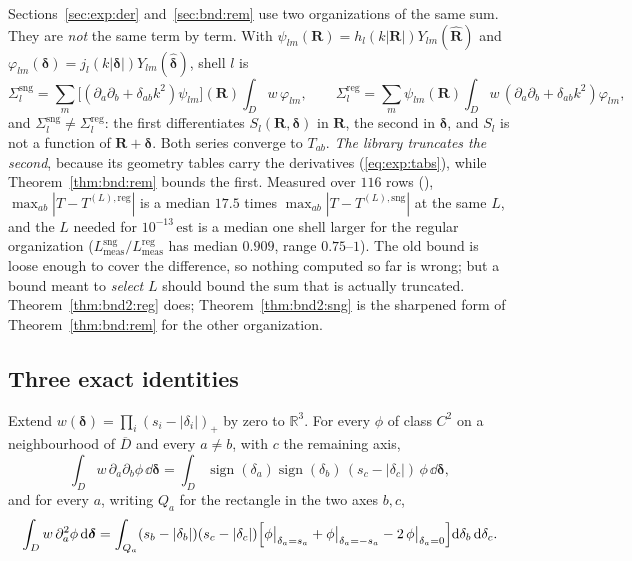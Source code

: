 Sections~\ref{sec:exp:der} and~\ref{sec:bnd:rem} use two organizations of the same sum.
They are \emph{not} the same term by term. With
$\psi_{lm}(\mathbf{R}) = h_l(k|\mathbf{R}|)Y_{lm}(\hat{\mathbf{R}})$ and
$\varphi_{lm}(\boldsymbol{\delta}) =
j_l(k|\boldsymbol{\delta}|)Y_{lm}(\hat{\boldsymbol{\delta}})$, shell $l$ is
\begin{equation}
\Sigma^{\mathrm{sng}}_l = \sum_m\bigl[(\partial_a\partial_b+\delta_{ab}k^2)\psi_{lm}\bigr]
(\mathbf{R})\!\int_D\! w\,\varphi_{lm},
\qquad
\Sigma^{\mathrm{reg}}_l = \sum_m \psi_{lm}(\mathbf{R})\!\int_D\! w\,
(\partial_a\partial_b+\delta_{ab}k^2)\varphi_{lm},
\label{eq:bnd2:two}
\end{equation}
and $\Sigma^{\mathrm{sng}}_l \neq \Sigma^{\mathrm{reg}}_l$: the first differentiates
$S_l(\mathbf{R},\boldsymbol{\delta})$ in $\mathbf{R}$, the second in
$\boldsymbol{\delta}$, and $S_l$ is not a function of
$\mathbf{R}+\boldsymbol{\delta}$. Both series converge to $T_{ab}$. \emph{The library
truncates the second}, because its geometry tables carry the derivatives
(\eqref{eq:exp:tabs}), while Theorem~\ref{thm:bnd:rem} bounds the first. Measured over
$116$ rows (), $\max_{ab}|T-T^{(L),\mathrm{reg}}|$ is a median $17.5$ times
$\max_{ab}|T-T^{(L),\mathrm{sng}}|$ at the same $L$, and the $L$ needed for
$10^{-13}\,\mathrm{est}$ is a median one shell larger for the regular organization
($L^{\mathrm{sng}}_{\mathrm{meas}}/L^{\mathrm{reg}}_{\mathrm{meas}}$ has median $0.909$,
range $0.75$--$1$). The old bound is loose enough to cover the difference, so nothing
computed so far is wrong; but a bound meant to \emph{select} $L$ should bound the sum that
is actually truncated. Theorem~\ref{thm:bnd2:reg} does; Theorem~\ref{thm:bnd2:sng} is the
sharpened form of Theorem~\ref{thm:bnd:rem} for the other organization.

\subsection{Three exact identities}
\label{sec:bnd2:lem}

\begin{lemma}
\label{lem:bnd2:ibp}
Extend $w(\boldsymbol{\delta}) = \prod_i(s_i-|\delta_i|)_+$ by zero to $\mathbb{R}^3$. For
every $\phi$ of class $C^2$ on a neighbourhood of $\overline{D}$ and every $a \neq b$,
with $c$ the remaining axis,
\begin{equation}
\int_D w\,\partial_a\partial_b\phi\,\dd\boldsymbol{\delta}
= \int_D \operatorname{sign}(\delta_a)\operatorname{sign}(\delta_b)\,(s_c-|\delta_c|)\,
\phi\,\dd\boldsymbol{\delta},
\label{eq:bnd2:ibpo}
\end{equation}
and for every $a$, writing $Q_a$ for the rectangle in the two axes $b,c$,
\begin{equation}
\int_D w\,\partial_a^2\phi\,\mathrm{d}\boldsymbol{\delta}
= \int_{Q_a}(s_b-|\delta_b|)(s_c-|\delta_c|)\Bigl[
\phi\big|_{\delta_a = s_a} + \phi\big|_{\delta_a = -s_a}
- 2\,\phi\big|_{\delta_a = 0}\Bigr]\mathrm{d}\delta_b\,\mathrm{d}\delta_c .
\label{eq:bnd2:ibpd}
\end{equation}
\end{lemma}

